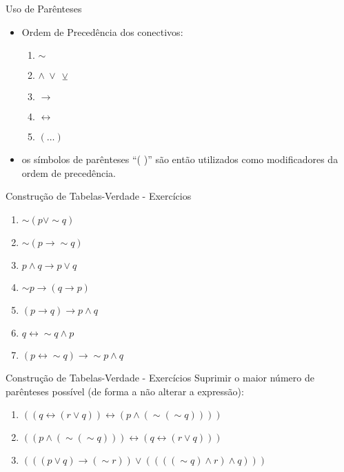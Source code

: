 \begin{frame}[t]{Uso de Parênteses} %
	\begin{itemize}
	\item Ordem de Precedência dos conectivos:
	\begin{enumerate}
	\item $\sim$
	\item $\wedge ~ \vee ~ \veebar$
	\item $\rightarrow$
	\item $\leftrightarrow$
	\item $( \ldots )$
	\end{enumerate}

	\item os símbolos de parênteses ``( )'' são então utilizados como modificadores da ordem de precedência.
	\end{itemize}
\end{frame}

\begin{frame}[t]{Construção de Tabelas-Verdade - Exercícios} %
	\begin{enumerate}
	\item $\sim (p \vee \sim q)$
	\item $\sim (p \rightarrow \sim q)$
	\item $p \wedge q \rightarrow p \vee q$
	\item $\sim p \rightarrow (q \rightarrow p)$
	\item $(p \rightarrow q) \rightarrow p \wedge q$
	\item $q \leftrightarrow \sim q \wedge p$
	\item $(p \leftrightarrow \sim q) \rightarrow \sim p \wedge q$
	\end{enumerate}
\end{frame}

\begin{frame}[t]{Construção de Tabelas-Verdade - Exercícios} %
	Suprimir o maior número de parênteses possível (de forma a não alterar a expressão):
	\begin{enumerate}
	\item $((q \leftrightarrow (r \vee q)) \leftrightarrow (p \wedge (\sim (\sim q))))$
	\item $((p \wedge (\sim (\sim q))) \leftrightarrow (q \leftrightarrow (r \vee q)))$
	\item $(((p \vee q) \rightarrow (\sim r)) \vee ((((\sim q) \wedge r) \wedge q)))$
	\end{enumerate}
\end{frame}

